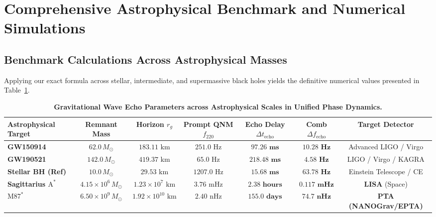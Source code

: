 \documentclass[11pt,a4paper]{article}
\begin{document}
\section{Comprehensive Astrophysical Benchmark and Numerical Simulations}

\subsection{Benchmark Calculations Across Astrophysical Masses}
Applying our exact formula across stellar, intermediate, and supermassive black holes yields the definitive numerical values presented in Table~\ref{tab:echo_benchmark}.

\begin{table}[htbp]
\centering
\small
\caption{\textbf{Gravitational Wave Echo Parameters across Astrophysical Scales in Unified Phase Dynamics.}}
\label{tab:echo_benchmark}
\vspace{2mm}
\begin{tabular}{lcccccc}
\toprule
\textbf{Astrophysical Target} & \textbf{Remnant Mass} & \textbf{Horizon $r_g$} & \textbf{Prompt QNM $f_{220}$} & \textbf{Echo Delay $\Delta t_{\mathrm{echo}}$} & \textbf{Comb $\Delta f_{\mathrm{echo}}$} & \textbf{Target Detector} \\
\midrule
\textbf{GW150914} & $62.0\,M_\odot$ & $183.11\text{ km}$ & $251.0\text{ Hz}$ & $\mathbf{97.26\text{ ms}}$ & $\mathbf{10.28\text{ Hz}}$ & Advanced LIGO / Virgo \\
\textbf{GW190521} & $142.0\,M_\odot$ & $419.37\text{ km}$ & $65.0\text{ Hz}$ & $\mathbf{218.48\text{ ms}}$ & $\mathbf{4.58\text{ Hz}}$ & LIGO / Virgo / KAGRA \\
\textbf{Stellar BH (Ref)} & $10.0\,M_\odot$ & $29.53\text{ km}$ & $1207.0\text{ Hz}$ & $\mathbf{15.68\text{ ms}}$ & $\mathbf{63.78\text{ Hz}}$ & Einstein Telescope / CE \\
\textbf{Sagittarius $\text{A}^*$} & $4.15 \times 10^6\,M_\odot$ & $1.23 \times 10^7\text{ km}$ & $3.76\text{ mHz}$ & $\mathbf{2.38\text{ hours}}$ & $\mathbf{0.117\text{ mHz}}$ & \textbf{LISA} (Space) \\
\textbf{$\text{M87}^*$} & $6.50 \times 10^9\,M_\odot$ & $1.92 \times 10^{10}\text{ km}$ & $2.40\text{ nHz}$ & $\mathbf{155.0\text{ days}}$ & $\mathbf{74.7\text{ nHz}}$ & \textbf{PTA (NANOGrav/EPTA)} \\
\bottomrule
\end{tabular}
\end{table}
\end{document}
